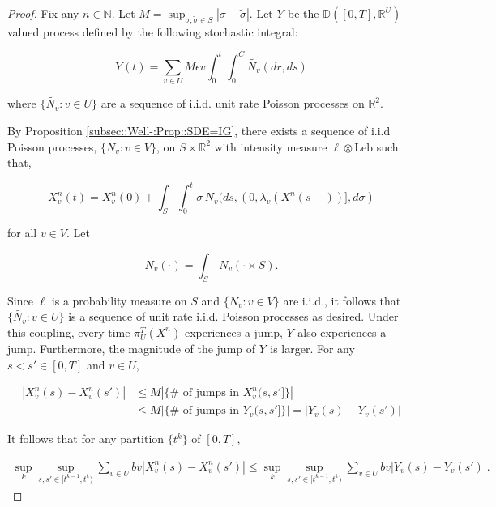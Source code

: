 \documentclass[12pt]{article}
\newcommand{\mb}{\mathbb}
\newcommand{\te}{\text}
\newcommand{\ep}{\epsilon}
\newcommand{\ind}{\hspace{24pt}}
\newcommand{\cad}{\mb{D}}							%
\renewcommand{\v}{v}							%
\renewcommand{\U}{U}							%
\renewcommand{\S}{S}							%
\newcommand{\s}{\sigma}							%
\renewcommand{\b}{b}							%
\newcommand{\ev}{\ep}							%
\newcommand{\T}{T}								%
\renewcommand{\t}{t}							%
\renewcommand{\ss}[1]{^{#1}}					%
\newcommand{\poiss}[1]{N_{#1}}						%
\newcommand{\leb}{\te{Leb}}							%
\newcommand{\pup}[1]{^{#1}}							%
\renewcommand{\ss}{\tilde{\s}}					%
\newcommand{\V}{V}									%
\renewcommand{\tt}{s}								%
\newcommand{\ttt}{s'}								%
\renewcommand{\r}{r}								%
\renewcommand{\it}{k}								%
\newcommand{\numb}{n}								%
\newcommand{\piV}[2]{\pi_{#1}^{#2}}					%
\newcommand{\rxvtn}[3]{X_{#1}^{#3}(#2)}				%
\newcommand{\rxvtt}[2]{Y_{#1}{(#2)}}				%
\newcommand{\rxvtsn}[3]{X_{#1}^{#3}{#2}}			%
\newcommand{\rxvtts}[2]{Y_{#1}{#2}}					%
\newcommand{\rate}[1]{\lambda_{#1}}					%
\newcommand{\const}[1]{C_{#1}}						%
\newcommand{\Sm}{\ell}								%
\newcommand{\alt}{\widetilde}						%
\begin{document}
\begin{proof}
Fix any \(\numb \in \mb{N}\). Let \(M = \sup_{\s,\ss \in \S} |\s - \ss|\). Let \(\rxvtts{}{}\) be the \(\cad([0,\T],\mb{R}^\U)\)-valued process defined by the following stochastic integral:

\[\rxvtt{}{\t} = \sum_{\v \in \U}M\ev{\v}\int_0^\t\int_0^{\const{}}\alt{\poiss{\v}}(d\r, d\tt)\]

where \(\{\alt{\poiss{\v}}:\v \in \U\}\) are a sequence of i.i.d. unit rate Poisson processes on \(\mb{R}^2\). 

\ind By Proposition \ref{subsec::Well-:Prop::SDE=IG}, there exists a sequence of i.i.d Poisson processes, \(\{\poiss{\v}:\v\in \V\}\), on \(\S\times\mb{R}^2\) with intensity measure \(\Sm\otimes \leb\) such that,

\[\rxvtn{\v}{\t}{\numb} = \rxvtn{\v}{0}{\numb} + \int_\S\int_0^\t \s\,\poiss{\v}(d\tt,(0,\rate{\v}(\rxvtn{}{\tt-}{\numb})],d\s)\]

for all \(\v\in \V\). Let

\[\alt{\poiss{\v}}(\cdot) = \int_\S\,\poiss{\v}(\cdot\times \S).\]

Since \(\Sm\) is a probability measure on \(\S\) and \(\{\poiss{\v}:\v\in \V\}\) are i.i.d., it follows that \(\{\alt{\poiss{\v}}:\v\in \U\}\) is a sequence of unit rate i.i.d. Poisson processes as desired. Under this coupling, every time \(\piV{\U}{\T}(\rxvtsn{}{}{\numb})\) experiences a jump, \(\rxvtts{}{}\) also experiences a jump. Furthermore, the magnitude of the jump of \(\rxvtts{}{}\) is larger. For any \(\tt<\ttt\in [0,\T]\) and \(\v\in \U\),

\begin{align*}
|\rxvtn{\v}{\tt}{\numb} - \rxvtn{\v}{\ttt}{\numb}|&\leq M\left|\{\#\te{ of jumps in }\rxvtsn{\v}{(\tt,\ttt]}{\numb}\}\right| \\
&\leq M\left|\{\#\te{ of jumps in }\rxvtts{\v}{(\tt,\ttt]}\}\right| = \left|\rxvtt{\v}{\tt} - \rxvtt{\v}{\ttt}\right|
\end{align*}

It follows that for any partition \(\{\t\pup{\it}\}\) of \([0,\T]\),

\begin{align*}
\sup_\it\sup_{\tt,\ttt \in [\t\pup{\it-1},\t\pup{\it})} \sum_{\v\in \U} \b{\v}|\rxvtn{\v}{\tt}{\numb} - \rxvtn{\v}{\ttt}{\numb}|\leq \sup_\it\sup_{\tt,\ttt \in [\t\pup{\it-1},\t\pup{\it})} \sum_{\v\in \U} \b{\v}|\rxvtt{\v}{\tt} - \rxvtt{\v}{\ttt}|.
\end{align*}


\end{proof}
\end{document}
